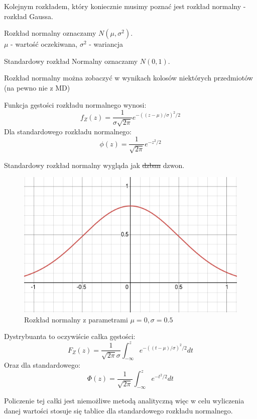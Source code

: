 Kolejnym rozkładem, który koniecznie musimy poznać jest rozkład normalny - rozkład Gaussa. \\

\begin{definition}
    Rozkład normalny oznaczamy \(N(\mu , \sigma^2 )\).\\
    \(\mu\) - wartość oczekiwana,
    \(\sigma^2\) - wariancja
\end{definition}

\begin{definition}
    Standardowy rozkład Normalny oznaczamy \(N(0, 1)\).
\end{definition}

Rozkład normalny można zobaczyć w wynikach kolosów niektórych przedmiotów (na pewno nie z MD)

\begin{definition}
    Funkcja gęstości rozkładu normalnego wynosi: \[ f_Z(z) =  \frac{1}{\sigma\sqrt{2\pi}}e^{-((z - \mu)/\sigma)^2/2} \]
    Dla standardowego rozkładu normalnego:
    \[ \phi(z) =  \frac{1}{\sqrt{2\pi}}e^{-z^2/2} \]
\end{definition}

Standardowy rozkład normalny wygląda jak \sout{dzban} dzwon.

\begin{figure}[H]
    \centering
    \includegraphics[scale=0.75]{img/normal-distribution/normal-distribution-0-0.5.png}
    \caption{Rozkład normalny z parametrami \( \mu = 0, \sigma = 0.5 \)}
\end{figure}

\begin{definition}
    Dystrybuanta to oczywiście całka gęstości:
    \[
    F_Z(z) = \frac{1}{\sqrt{2\pi}\sigma}\int_{-\infty}^{z}e^{-((t -\mu)/\sigma)^2/2} dt
    \]
    Oraz dla standardowego:
    \[
    \Phi(z) = \frac{1}{\sqrt{2\pi}}\int_{-\infty}^{z}e^{-t^2/2} dt
    \]
\end{definition}

Policzenie tej całki jest niemożliwe metodą analityczną więc w celu wyliczenia danej wartości stosuje się tablice dla standardowego rozkładu normalnego. 
